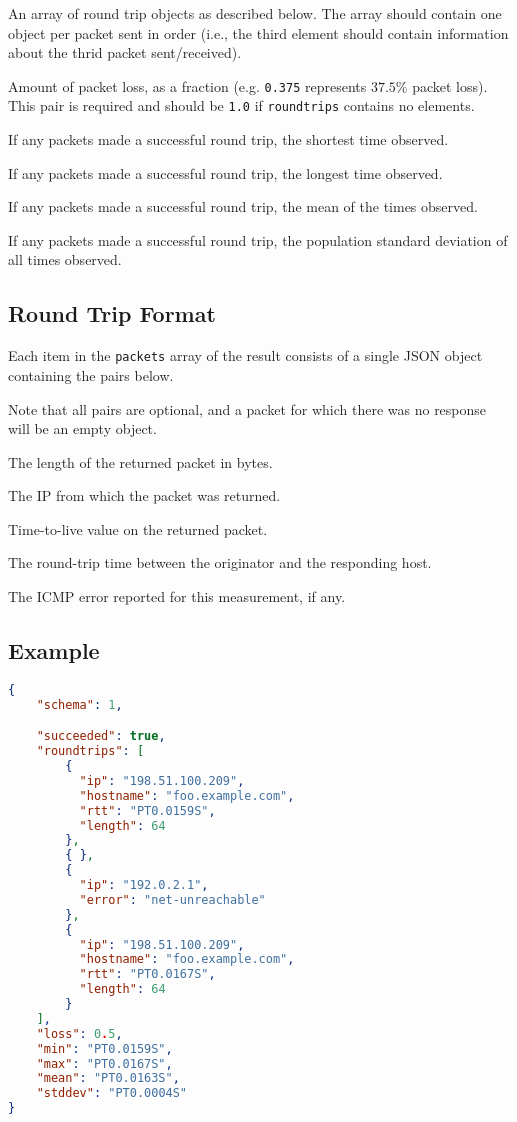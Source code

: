 \documentclass[10pt]{article}
\begin{document}
 An array of round trip objects as
described below.  The array should contain one object per packet sent
in order (i.e., the third element should contain information about the
thrid packet sent/received).

 Amount of packet loss, as a fraction
(e.g. {\tt 0.375} represents $37.5\%$ packet loss).  This pair is
required and should be {\tt 1.0} if {\tt roundtrips} contains no
elements.

 If any packets made a successful round trip,
the shortest time observed.

 If any packets made a successful round trip,
the longest time observed.

 If any packets made a successful round trip,
the mean of the times observed.

 If any packets made a successful round
trip, the population standard deviation of all times observed.




\subsection{Round Trip Format}

Each item in the {\tt packets} array of the result consists of a single
JSON object containing the pairs below.  \seejson

Note that all pairs are optional, and a packet for which there was no
response will be an empty object.

 The length of the returned packet in bytes.

 The IP from which the packet was returned.

 Time-to-live value on the returned packet.

 The round-trip time between the originator
and the responding host.

 The ICMP error reported for this
measurement, if any.


\subsection{Example}
\begin{lstlisting}[language=json]
{
    "schema": 1,

    "succeeded": true,
    "roundtrips": [
        {
          "ip": "198.51.100.209",
          "hostname": "foo.example.com",
          "rtt": "PT0.0159S",
          "length": 64
        },
        { },
        {
          "ip": "192.0.2.1",
          "error": "net-unreachable"
        },
        {
          "ip": "198.51.100.209",
          "hostname": "foo.example.com",
          "rtt": "PT0.0167S",
          "length": 64
        }
    ],
    "loss": 0.5,
    "min": "PT0.0159S",
    "max": "PT0.0167S",
    "mean": "PT0.0163S",
    "stddev": "PT0.0004S"
}
\end{lstlisting}
\end{document}
